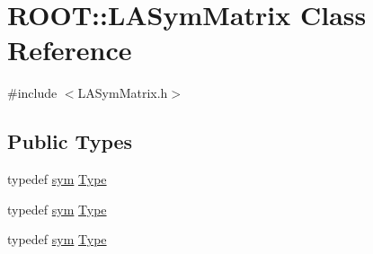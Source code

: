 \hypertarget{classROOT_1_1Minuit2_1_1LASymMatrix}{}\section{R\+O\+OT\+:\+:L\+A\+Sym\+Matrix Class Reference}
\label{classROOT_1_1Minuit2_1_1LASymMatrix}


{\ttfamily \#include $<$L\+A\+Sym\+Matrix.\+h$>$}

\subsection*{Public Types}
\begin{DoxyCompactItemize}
\item 
typedef \mbox{\hyperlink{classROOT_1_1Minuit2_1_1sym}{sym}} \mbox{\hyperlink{classROOT_1_1Minuit2_1_1LASymMatrix_a339ed010f480472ba1029aef21c149ea}{Type}}
\item 
typedef \mbox{\hyperlink{classROOT_1_1Minuit2_1_1sym}{sym}} \mbox{\hyperlink{classROOT_1_1Minuit2_1_1LASymMatrix_a339ed010f480472ba1029aef21c149ea}{Type}}
\item 
typedef \mbox{\hyperlink{classROOT_1_1Minuit2_1_1sym}{sym}} \mbox{\hyperlink{classROOT_1_1Minuit2_1_1LASymMatrix_a339ed010f480472ba1029aef21c149ea}{Type}}
\end{DoxyCompactItemize}
